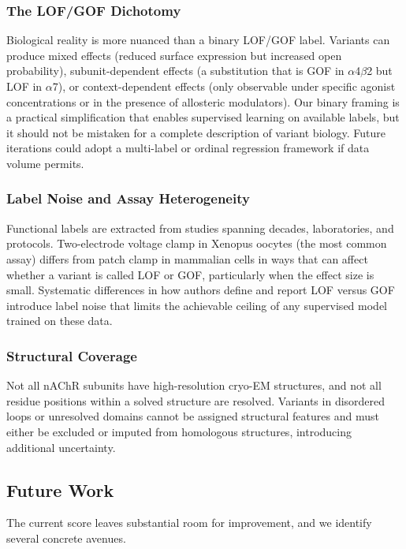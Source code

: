 \documentclass{ws-procs11x85}
\begin{document}
\subsubsection{The LOF/GOF Dichotomy}

Biological reality is more nuanced than a binary LOF/GOF label.
Variants can produce mixed effects (reduced surface expression but
increased open probability), subunit-dependent effects (a substitution
that is GOF in $\alpha$4$\beta$2 but LOF in $\alpha$7), or
context-dependent effects (only observable under specific agonist
concentrations or in the presence of allosteric modulators). Our
binary framing is a practical simplification that enables supervised
learning on available labels, but it should not be mistaken for a
complete description of variant biology. Future iterations could
adopt a multi-label or ordinal regression framework if data volume
permits.

\subsubsection{Label Noise and Assay Heterogeneity}

Functional labels are extracted from studies spanning decades,
laboratories, and protocols. Two-electrode voltage clamp in Xenopus
oocytes (the most common assay) differs from patch clamp in mammalian
cells in ways that can affect whether a variant is called LOF or GOF,
particularly when the effect size is small. Systematic differences in
how authors define and report LOF versus GOF introduce label noise
that limits the achievable ceiling of any supervised model trained on
these data.

\subsubsection{Structural Coverage}

Not all nAChR subunits have high-resolution cryo-EM structures, and
not all residue positions within a solved structure are resolved.
Variants in disordered loops or unresolved domains cannot be assigned
structural features and must either be excluded or imputed from
homologous structures, introducing additional uncertainty.

\subsection{Future Work}

The current score leaves substantial room for improvement, and we
identify several concrete avenues.
\end{document}
